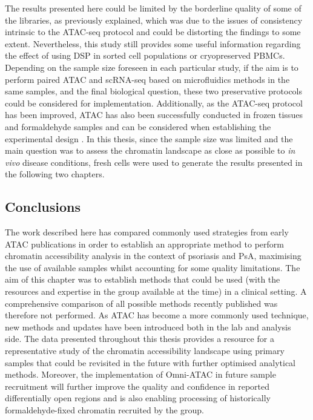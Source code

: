 The results presented here could be limited by the borderline quality of some of the libraries, as previously explained, which was due to the issues of consistency intrinsic to the ATAC-seq protocol and could be distorting the findings to some extent. Nevertheless, this study still provides some useful information regarding the effect of using DSP in sorted cell populations or cryopreserved PBMCs. Depending on the sample size foreseen in each particular study, if the aim is to perform paired ATAC and scRNA-seq based on microfluidics methods in the same samples, and the final biological question, these two preservative protocols could be considered for implementation. Additionally, as the ATAC-seq protocol has been improved, ATAC has also been successfully conducted in frozen tissues and formaldehyde samples and can be considered when establishing the experimental design \parencite{Corces2017, Chen2016}. In this thesis, since the sample size was limited and the main question was to assess the chromatin landscape as close as possible to \textit{in vivo} disease conditions, fresh cells were used to generate the results presented in the following two chapters.

\subsection{Conclusions}
The work described here has compared commonly used strategies from early ATAC publications in order to establish an appropriate method to perform chromatin accessibility analysis in the context of psoriasis and PsA, maximising the use of available samples whilst accounting for some quality limitations. The aim of this chapter was to establish methods that could be used (with the resources and expertise in the group available at the time) in a clinical setting. A comprehensive comparison of all possible methods recently published was therefore not performed. As ATAC has become a more commonly used technique, new methods and updates have been introduced both in the lab and analysis side. The data presented throughout this thesis provides a resource for a representative study of the chromatin accessibility landscape using primary samples that could be revisited in the future with further optimised analytical methods. Moreover, the implementation of Omni-ATAC in future sample recruitment will further improve the quality and confidence in reported differentially open regions and is also enabling processing of historically formaldehyde-fixed chromatin recruited by the group.
